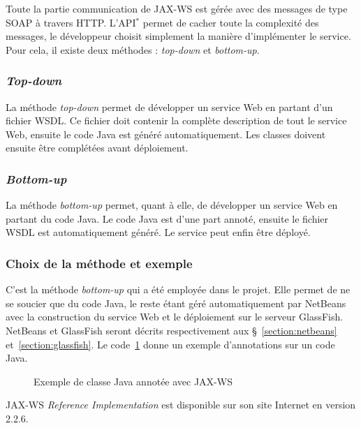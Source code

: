 Toute la partie communication de JAX-WS est g\'er\'ee avec des messages de type SOAP \`a travers HTTP.
L'API$^*$ permet de cacher toute la complexit\'e des messages, le d\'eveloppeur choisit simplement la mani\`ere d'impl\'ementer le service. 
Pour cela, il existe deux m\'ethodes : \textit{top-down} et \textit{bottom-up}.

\subsubsection{\textit{Top-down}}

La m\'ethode \textit{top-down} permet de d\'evelopper un service Web en partant d'un fichier WSDL.
Ce fichier doit contenir la compl\`ete description de tout le service Web, ensuite le code Java est g\'en\'er\'e automatiquement.
Les classes doivent ensuite \^etre compl\'et\'ees avant d\'eploiement.

\subsubsection{\textit{Bottom-up}}

La m\'ethode \textit{bottom-up} permet, quant \`a elle, de d\'evelopper un service Web en partant du code Java.
Le code Java est d'une part annot\'e, ensuite le fichier WSDL est automatiquement g\'en\'er\'e.
Le service peut enfin \^etre d\'eploy\'e.

\subsubsection{Choix de la m\'ethode et exemple}

C'est la m\'ethode \textit{bottom-up} qui a \'et\'e employ\'ee dans le projet.
Elle permet de ne se soucier que du code Java, le reste \'etant g\'er\'e automatiquement par NetBeans avec la construction du service Web et le d\'eploiement sur le serveur GlassFish.
NetBeans et GlassFish seront d\'ecrits respectivement aux \S~\ref{section:netbeans} et~\ref{section:glassfish}.
Le code~\ref{code:exempleJAXWS} donne un exemple d'annotations sur un code Java.

\clearpage

\begin{figure}[!ht]
	
	\caption{Exemple de classe Java annot\'ee avec JAX-WS}
	\label{code:exempleJAXWS}

\end{figure}

JAX-WS \textit{Reference Implementation} est disponible sur son site Internet\cite{biblio:siteJAXWS} en version 2.2.6.

\clearpage
